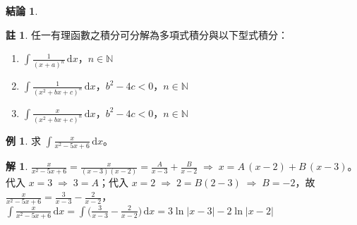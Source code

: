\documentclass[12pt]{extarticle}
\newcommand{\ds}{\displaystyle}
\newcommand{\ie}{\;\Longrightarrow\;}
\DeclareMathOperator*{\degr}{deg}
\theoremstyle{definition}
\newtheorem*{fact}{結論}
\newtheorem*{ex}{例}
\newtheorem*{sol}{解}
\newtheorem*{rmk}{註}
\begin{document}
\begin{fact}
\begin{enumerate}

  \end{enumerate}
\end{fact}

\begin{rmk} 任一有理函數之積分可分解為多項式積分與以下型式積分：
  \begin{enumerate}\setlength{\itemsep}{0pt}
    \item $\ds\int\!\frac{1}{(x + a)^n}\,\text{d}x$，$n\in\mathbb{N}$
    \item $\ds\int\!\frac{1}{(x^2 + b x + c)^n}\,\text{d}x$，$b^2 - 4 c < 0$，$n\in\mathbb{N}$
    \item $\ds\int\!\frac{x}{(x^2 + b x + c)^n}\,\text{d}x$，$b^2 - 4 c < 0$，$n\in\mathbb{N}$
  \end{enumerate}
\end{rmk}

\begin{ex}
  求 $\ds\int\!\frac{x}{x^2 - 5x + 6}\,\text{d}x$。
\end{ex}

\begin{sol}
  $\ds\frac{x}{x^2 - 5x + 6} = \frac{x}{(x - 3)(x - 2)} = \frac{A}{x - 3} + \frac{B}{x - 2} \ie x = A\,(x - 2) + B\,(x - 3)$。代入 $x = 3\ie 3 = A$；代入 $x = 2\ie 2 = B(2 - 3) \ie B = -2$，故 $\ds\frac{x}{x^2 - 5x + 6} = \frac{3}{x - 3} - \frac{2}{x - 2}$，$\ds\int\!\frac{x}{x^2 - 5x + 6}\,\text{d}x = \int\bigg(\frac{3}{x - 3} - \frac{2}{x - 2}\bigg)\,\text{d}x = 3\ln|x - 3| - 2\ln|x - 2|$
\end{sol}
\end{document}
